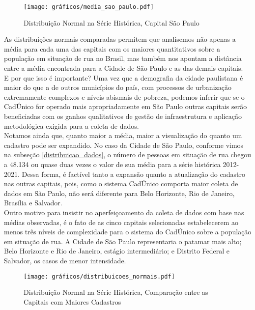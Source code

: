 \documentclass[14pt]{extarticle}
\begin{document}
\begin{figure}[H]
\centering
	\caption{Distribuição Normal na Série Histórica, Capital São Paulo}
	\texttt{[image: gráficos/media\_sao\_paulo.pdf]}
	\label{fig:pop_rua_dist_normal}
\end{figure}

As distribuições normais comparadas permitem que analisemos não apenas a média para cada uma das capitais com os maiores quantitativos sobre a população em situação de rua no Brasil, mas também nos apontam a distância entre a média encontrada para a Cidade de São Paulo e as das demais capitais.\\

E por que isso é importante? Uma vez que a demografia da cidade paulistana é maior do que a de outros municípios do país, com processos de urbanização extremamente complexos e níveis abismais de pobreza, podemos inferir que se o CadÚnico for operado mais apropriadamente em São Paulo outras capitais serão beneficiadas com os ganhos qualitativos de gestão de infraestrutura e aplicação metodológica exigida para a coleta de dados.\\

Notamos ainda que, quanto maior a média, maior a visualização do quanto um cadastro pode ser expandido. No caso da Cidade de São Paulo, conforme vimos na subseção \ref{distribuicao_dados}, o número de pessoas em situação de rua chegou a 48.134 ou quase duas vezes o valor de sua média para a série histórica 2012-2021. Dessa forma, é factível tanto a expansão quanto a atualização do cadastro nas outras capitais, pois, como o sistema CadÚnico comporta maior coleta de dados em São Paulo, não será diferente para Belo Horizonte, Rio de Janeiro, Brasília e Salvador.\\

Outro motivo para insistir no aperfeiçoamento da coleta de dados com base nas médias observadas, é o fato de as cinco capitais selecionadas estabelecerem ao menos três níveis de complexidade para o sistema do CadÚnico sobre a população em situação de rua. A Cidade de São Paulo representaria o patamar mais alto; Belo Horizonte e Rio de Janeiro, estágio intermediário; e Distrito Federal e Salvador, os casos de menor intensidade.\\ 

\begin{figure}[H]
\centering
	\caption{Distribuição Normal na Série Histórica, Comparação entre as Capitais com Maiores Cadastros}
	\texttt{[image: gráficos/distribuicoes\_normais.pdf]}
	\label{fig:pop_rua_dist_normal2}
\end{figure}
\end{document}
